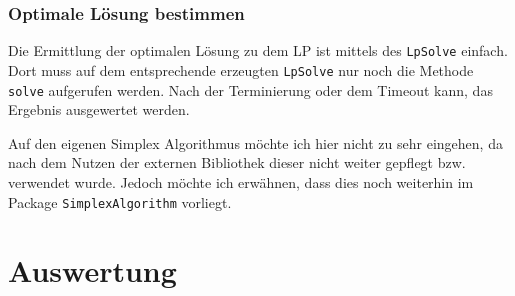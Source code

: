 \documentclass[a4paper, 12pt]{article}
\begin{document}
\subsubsection{Optimale Lösung bestimmen}

Die Ermittlung der optimalen Lösung zu dem LP ist mittels des \texttt{LpSolve} einfach.
Dort muss auf dem entsprechende erzeugten \texttt{LpSolve} nur noch die Methode \texttt{solve} aufgerufen werden.
Nach der Terminierung oder dem Timeout kann, das Ergebnis ausgewertet werden.

Auf den eigenen Simplex Algorithmus möchte ich hier nicht zu sehr eingehen, da nach dem Nutzen der externen Bibliothek dieser nicht weiter gepflegt bzw. verwendet wurde.
Jedoch möchte ich erwähnen, dass dies noch weiterhin im Package \texttt{SimplexAlgorithm} vorliegt.

\section{Auswertung}
\end{document}
